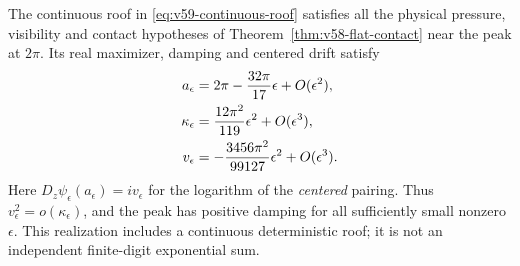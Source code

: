 \begin{theorem}
\label{thm:v59-markov-contact}
The continuous roof in \eqref{eq:v59-continuous-roof} satisfies all the
physical pressure, visibility and contact hypotheses of
Theorem~\ref{thm:v58-flat-contact} near the peak at $2\pi$. Its real
maximizer, damping and centered drift satisfy
\begin{align}
 a_\epsilon&=2\pi-\frac{32\pi}{17}\epsilon+O(\epsilon^2),\notag\\
 \kappa_\epsilon&=\frac{12\pi^2}{119}\epsilon^2+O(\epsilon^3),\notag\\
 v_\epsilon&=-\frac{3456\pi^2}{99127}\epsilon^2+O(\epsilon^3).
                                              \label{eq:v59-markov-expansions}
\end{align}
Here $D_z\psi_\epsilon(a_\epsilon)=iv_\epsilon$ for the logarithm
of the \emph{centered} pairing. Thus $v_\epsilon^2=o(\kappa_\epsilon)$,
and the peak has positive damping for all sufficiently small nonzero
$\epsilon$. This realization includes a continuous deterministic roof;
it is not an independent finite-digit exponential sum.
\end{theorem}
